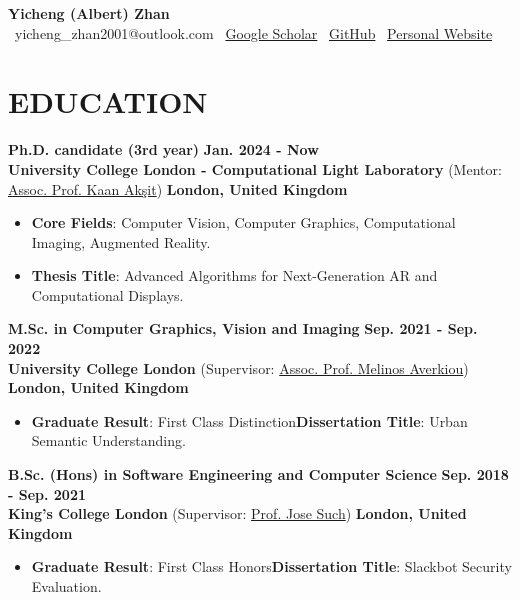 \documentclass[10pt,a4paper]{article}
\begin{document}
\begin{center}
{\LARGE \textbf{Yicheng (Albert) Zhan}}\\[0.3em]
\faEnvelope~yicheng\_zhan2001@outlook.com \enspace\textcolor{gray}{\textbar}\enspace \faGraduationCap~\href{https://scholar.google.com/citations?user=x2ptSYUAAAAJ}{Google Scholar} \enspace\textcolor{gray}{\textbar}\enspace \faGithub~\href{https://github.com/AlberTgarY}{GitHub} \enspace\textcolor{gray}{\textbar}\enspace \faGlobe~\href{https://albertgary.github.io/}{Personal Website}
\end{center}

\section*{EDUCATION}
\textbf{Ph.D. candidate (3rd year)} \hfill \textbf{Jan. 2024 - Now} \\
\textbf{University College London - Computational Light Laboratory} (Mentor: \href{https://www.kaanaksit.com/}{Assoc. Prof. Kaan Akşit}) \hfill \textbf{London, United Kingdom}\begin{itemize}
\item \textbf{Core Fields}: Computer Vision, Computer Graphics, Computational Imaging, Augmented Reality.
\item \textbf{Thesis Title}: Advanced Algorithms for Next-Generation AR and Computational Displays.
\end{itemize}

\textbf{M.Sc. in Computer Graphics, Vision and Imaging} \hfill \textbf{Sep. 2021 - Sep. 2022} \\
\textbf{University College London} (Supervisor: \href{https://melinos.github.io/}{Assoc. Prof. Melinos Averkiou}) \hfill \textbf{London, United Kingdom}\begin{itemize}
\item \textbf{Graduate Result}: First Class Distinction\enspace\textcolor{gray}{\textbar}\enspace \textbf{Dissertation Title}: Urban Semantic Understanding.
\end{itemize}

\textbf{B.Sc. (Hons) in Software Engineering and Computer Science} \hfill \textbf{Sep. 2018 - Sep. 2021} \\
\textbf{King's College London} (Supervisor: \href{https://scholar.google.com/citations?user=xNr_IMUAAAAJ}{Prof. Jose Such}) \hfill \textbf{London, United Kingdom}\begin{itemize}
\item \textbf{Graduate Result}: First Class Honors\enspace\textcolor{gray}{\textbar}\enspace \textbf{Dissertation Title}: Slackbot Security Evaluation.
\end{itemize}
\end{document}
